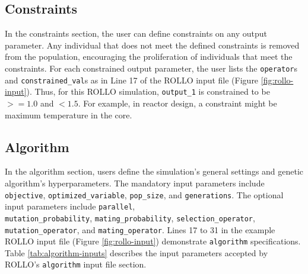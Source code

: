 \subsection{Constraints}
In the constraints section, the user can define constraints on any output parameter. 
Any individual that does not meet the defined constraints is removed from the 
population, encouraging the proliferation of individuals that meet the 
constraints. 
For each constrained output parameter, the user lists the \texttt{operator}s 
and \texttt{constrained\_val}s as in Line 17 of the \gls{ROLLO} input file 
(Figure \ref{fig:rollo-input}). 
Thus, for this \gls{ROLLO} simulation, \texttt{output\_1} is constrained to be 
$>= 1.0$ and $< 1.5$. 
For example, in reactor design, a constraint might be maximum temperature in the 
core.

\subsection{Algorithm}
In the algorithm section, users define the simulation's general settings and 
genetic algorithm's hyperparameters. 
The mandatory input parameters include \texttt{objective}, \texttt{optimized\_variable}, 
\texttt{pop\_size}, and \texttt{generations}.
The optional input parameters include \texttt{parallel}, \\
\texttt{mutation\_probability}, \texttt{mating\_probability}, 
\texttt{selection\_operator}, \texttt{mutation\_operator}, 
and \texttt{mating\_operator}. 
Lines 17 to 31 in the example \gls{ROLLO} input file (Figure \ref{fig:rollo-input}) 
demonstrate \texttt{algorithm} specifications. 
Table \ref{tab:algorithm-inputs} describes the input parameters accepted by
ROLLO's \texttt{algorithm} input file section.  
